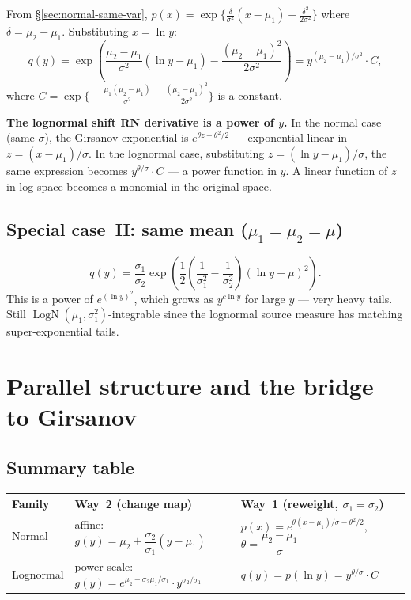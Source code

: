 \documentclass[11pt,a4paper]{article}
\newcommand{\LN}{\operatorname{LogN}}
\begin{document}
From \S\ref{sec:normal-same-var},
$p(x)=\exp\!\bigl\{\frac{\delta}{\sigma^2}(x-\mu_1)-\frac{\delta^2}{2\sigma^2}\bigr\}$
where $\delta=\mu_2-\mu_1$.  Substituting $x=\ln y$:
\[
  q(y)=\exp\!\left(\frac{\mu_2-\mu_1}{\sigma^2}(\ln y-\mu_1)-\frac{(\mu_2-\mu_1)^2}{2\sigma^2}\right)
      =y^{(\mu_2-\mu_1)/\sigma^2}\cdot C,
\]
where $C=\exp\!\bigl\{-\frac{\mu_1(\mu_2-\mu_1)}{\sigma^2}-\frac{(\mu_2-\mu_1)^2}{2\sigma^2}\bigr\}$
is a constant.

\noindent\textbf{The lognormal shift RN derivative is a power of $y$.}
In the normal case (same $\sigma$), the Girsanov exponential is $e^{\theta z-\theta^2/2}$ ---
exponential-linear in $z=(x-\mu_1)/\sigma$.  In the lognormal case, substituting
$z=(\ln y-\mu_1)/\sigma$, the same expression becomes $y^{\theta/\sigma}\cdot C$ --- a power
function in $y$.  A linear function of $z$ in log-space becomes a monomial in the original space.

\subsection{Special case~II: same mean ($\mu_1=\mu_2=\mu$)}

\[
  q(y)=\frac{\sigma_1}{\sigma_2}
       \exp\!\left(\frac{1}{2}\!\left(\frac{1}{\sigma_1^2}-\frac{1}{\sigma_2^2}\right)
                  (\ln y-\mu)^2\right).
\]
This is a power of $e^{(\ln y)^2}$, which grows as $y^{c\ln y}$ for large $y$ --- very heavy
tails.  Still $\LN(\mu_1,\sigma_1^2)$-integrable since the lognormal source measure has
matching super-exponential tails.

\section{Parallel structure and the bridge to Girsanov}
\label{sec:parallel}

\subsection{Summary table}

\begin{center}
\begin{tabular}{lll}
\toprule
\textbf{Family}
  & \textbf{Way~2 (change map)}
  & \textbf{Way~1 (reweight, $\sigma_1=\sigma_2$)} \\
\midrule
Normal
  & affine: $g(y)=\mu_2+\dfrac{\sigma_2}{\sigma_1}(y-\mu_1)$
  & $p(x)=e^{\theta(x-\mu_1)/\sigma-\theta^2/2}$,\; $\theta=\dfrac{\mu_2-\mu_1}{\sigma}$ \\[10pt]
Lognormal
  & power-scale: $g(y)=e^{\mu_2-\sigma_2\mu_1/\sigma_1}\cdot y^{\sigma_2/\sigma_1}$
  & $q(y)=p(\ln y)=y^{\theta/\sigma}\cdot C$ \\
\bottomrule
\end{tabular}
\end{center}
\end{document}
